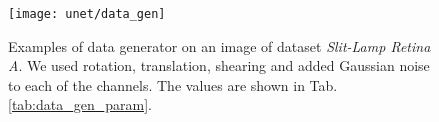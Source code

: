 \begin{figure}[!htbp]
  \centering
  \texttt{[image: unet/data\_gen]}
  \caption[Examples of data generator]{Examples of data generator on an image of dataset \textit{Slit-Lamp Retina A}. We used rotation, translation, shearing and added Gaussian noise to each of the channels. The values are shown in Tab. \ref{tab:data_gen_param}.}
  \label{fig:data_gen}
\end{figure}




